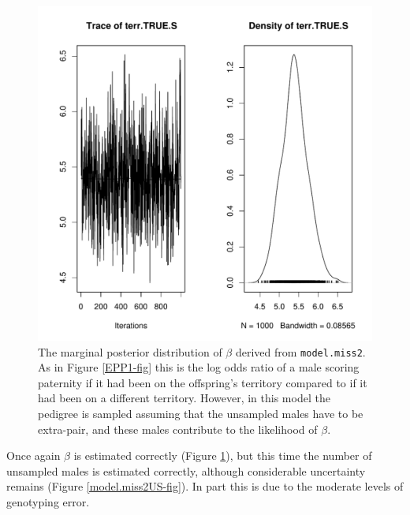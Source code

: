 \documentclass{article}
\begin{document}
\begin{figure}[!h]
\begin{center}
\includegraphics{Tutorial-076}
\end{center}
\caption{The marginal posterior distribution of $\beta$ derived from \texttt{model.miss2}. As in Figure \ref{EPP1-fig} this is the log odds ratio of a male scoring paternity if it had been on the offspring's territory compared to if it had been on a different territory. However, in this model the pedigree is sampled assuming that the unsampled males have to be extra-pair, and these males contribute to the likelihood of $\beta$.}
\label{model.miss2-fig}
\end{figure}

Once again $\beta$ is estimated correctly (Figure \ref{model.miss2-fig}), but this time the number of unsampled males is estimated correctly, although considerable uncertainty remains (Figure \ref{model.miss2US-fig}).  In part this is due to the moderate levels of genotyping error.\\
\end{document}
